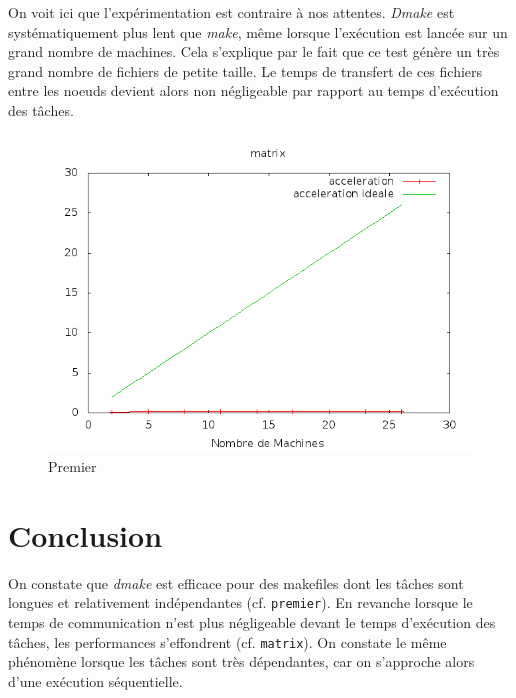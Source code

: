 \documentclass[a4paper,12pt,twoside]{article}
\begin{document}
On voit ici que l'expérimentation est contraire à nos
attentes. \emph{Dmake} est systématiquement plus lent que \emph{make},
même lorsque l'exécution est lancée sur un grand nombre de
machines. Cela s'explique par le fait que ce test génère un très grand
nombre de fichiers de petite taille. Le temps de transfert de ces
fichiers entre les noeuds devient alors non négligeable par rapport au
temps d'exécution des tâches.

\begin{figure}[H]
  \centering
  \includegraphics[scale=0.5]{acceleration_matrix.png}
  \caption{Premier}
  \label{fig:premier}
\end{figure}

\section*{Conclusion}
On constate que \emph{dmake} est efficace pour des makefiles dont les
tâches sont longues et relativement indépendantes
(cf. \texttt{premier}). En revanche lorsque le temps de communication
n'est plus négligeable devant le temps d'exécution des tâches, les
performances s'effondrent (cf. \texttt{matrix}). On constate le même phénomène lorsque les
tâches sont très dépendantes, car on s'approche alors d'une exécution séquentielle.
\end{document}
